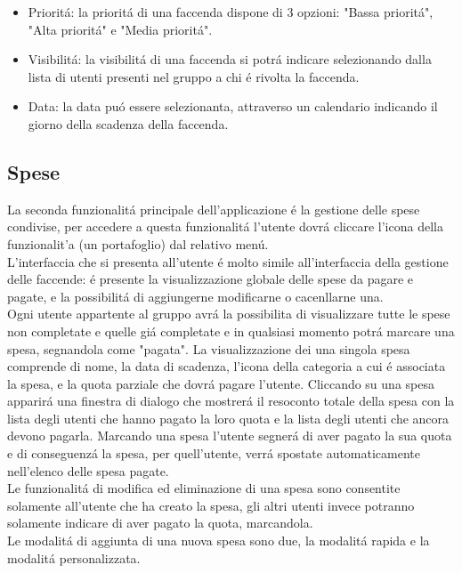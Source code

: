 \begin{itemize}
    \item Priorit\'a: la priorit\'a di una faccenda dispone di 3 opzioni: "Bassa priorit\'a", "Alta priorit\'a" e "Media priorit\'a".
    \item Visibilit\'a: la visibilit\'a di una faccenda si potr\'a indicare selezionando dalla lista di utenti presenti nel gruppo a chi \'e rivolta la faccenda.
    \item Data: la data pu\'o essere selezionanta, attraverso un calendario indicando il giorno della scadenza della faccenda.
\end{itemize}




\subsection{Spese}
La seconda funzionalit\'a principale dell'applicazione \'e la gestione delle spese condivise, per accedere a questa funzionalit\'a l'utente dovr\'a cliccare l'icona della funzionalit'a (un portafoglio) dal relativo men\'u.\\
L'interfaccia che si presenta all'utente \'e molto simile all'interfaccia della gestione delle faccende: \'e presente la visualizzazione globale delle spese da pagare e pagate, e la possibilit\'a di aggiungerne modificarne o cacenllarne una.\\
Ogni utente appartente al gruppo avr\'a la possibilita di visualizzare tutte le spese non completate e quelle gi\'a completate e in qualsiasi momento potr\'a marcare una spesa, segnandola come "pagata".
La visualizzazione dei una singola spesa comprende di nome, la data di scadenza, l'icona della categoria a cui \'e associata la spesa, e la quota parziale che dovr\'a pagare l'utente. Cliccando su una spesa apparir\'a una finestra di dialogo che mostrer\'a il resoconto totale della spesa con la lista degli utenti che hanno pagato la loro quota e la lista degli utenti che ancora devono pagarla. Marcando una spesa l'utente segner\'a di aver pagato la sua quota e di conseguenz\'a la spesa, per quell'utente, verr\'a spostate automaticamente nell'elenco delle spesa pagate.\\
Le funzionalit\'a di modifica ed eliminazione di una spesa sono consentite solamente all'utente che ha creato la spesa, gli altri utenti invece potranno solamente indicare di aver pagato la quota, marcandola.\\
Le modalit\'a di aggiunta di una nuova spesa sono due, la modalit\'a rapida e la modalit\'a personalizzata.\\
